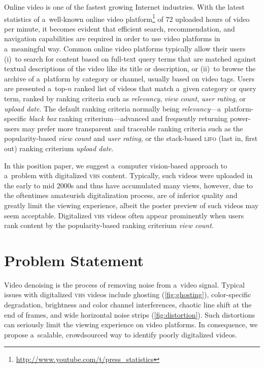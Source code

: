 \documentclass[runningheads,a4paper]{llncs}
\begin{document}
Online video is one of the fastest growing Internet industries.
With the latest statistics of a~well-known online video
platform\footnote{\url{http://www.youtube.com/t/press_statistics}}
of 72 uploaded hours of video per minute,
it becomes evident that efficient search, recommendation, and
navigation capabilities are required in order to use 
video platforms in a~meaningful way. 
Common online video platforms typically allow their users
(i)~to search for content based on full-text query terms
that are matched against textual descriptions
of the video like its title or description,
or (ii)~to browse the archive of a~platform by category or channel,
usually based on video tags.
Users are presented a~top-$n$ ranked list of videos
that match a~given category
or query term, ranked by ranking criteria such as
\emph{relevancy}, \emph{view count},
\emph{user rating}, or \emph{upload date}.
The default ranking criteria normally being
\emph{relevancy}---a~platform-specific \emph{black box}
ranking criterium---advanced and frequently returning power-users
may prefer more transparent and traceable ranking criteria
such as the popularity-based \emph{view count}
and \emph{user rating}, or the stack-based
{\scshape lifo} (last in, first out) ranking criterium \emph{upload date}.

In this position paper, we suggest a~computer vision-based
approach to a~problem with digitalized {\scshape vhs} content.
Typically, such videos were uploaded in the early to mid 2000s
and thus have accumulated many views,
however, due to the oftentimes amateurish digitalization process,
are of inferior quality and greatly limit the viewing experience,
albeit the poster preview of such videos may seem acceptable.
Digitalized {\scshape vhs} videos often appear prominently
when users rank content by the popularity-based
ranking criterium \emph{view count}.

\section{Problem Statement}

Video denoising is the process of removing noise from a~video signal.
Typical issues with digitalized {\scshape vhs} videos include 
ghosting (\autoref{fig:ghosting}),
color-specific degradation,
brightness and color channel interferences,
chaotic line shift at the end of frames,
and wide horizontal noise strips (\autoref{fig:distortion}).
Such distortions can seriously limit the viewing experience
on video platforms.
In consequence, we propose a~scalable, crowdsourced way
to identify poorly digitalized videos.
\end{document}
